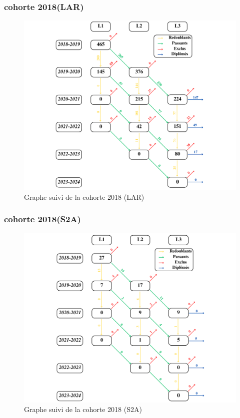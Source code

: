 \newpage
\subsubsection{cohorte 2018(LAR)}

\begin{figure}[ht]
    \centering
    \caption{Graphe suivi de la cohorte 2018 (LAR)}
    \includegraphics[width=1\textwidth]{figure/LAR_2018.png}
\end{figure}

\newpage
\subsubsection{cohorte 2018(S2A)}

\begin{figure}[ht]
    \centering
    \caption{Graphe suivi de la cohorte 2018 (S2A)}
    \includegraphics[width=1\textwidth]{figure/S2A_2018.png}
\end{figure}

